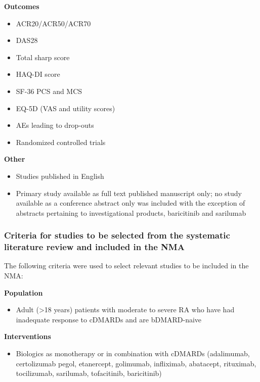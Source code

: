 \documentclass[11pt,final,fleqn]{article}\usepackage[]{graphicx}\usepackage[]{color}
\theoremstyle{plain}
\begin{document}
\begin{appendices}
\textbf{Outcomes}
\begin{itemize}
\item
  ACR20/ACR50/ACR70
\item
  DAS28
\item
  Total sharp score
\item
  HAQ-DI score
\item
  SF-36 PCS and MCS
\item
  EQ-5D (VAS and utility scores)
\item
  AEs leading to drop-outs
\end{itemize}

\begin{itemize}
\item
  Randomized controlled trials
\end{itemize}

\textbf{Other}

\begin{itemize}
\item
  Studies published in English
\item
  Primary study available as full text published manuscript only; no
  study available as a conference abstract only was included with the
  exception of abstracts pertaining to investigational products,
  baricitinib and sarilumab
\end{itemize}

\subsubsection{Criteria for studies to be selected from the systematic
literature review and included in the
NMA}\label{criteria-for-studies-to-be-selected-from-the-systematic-literature-review-and-included-in-the-nma}

The following criteria were used to select relevant studies to be
included in the NMA:

\textbf{Population}

\begin{itemize}
\item
  Adult (\textgreater{}18 years) patients with moderate to severe RA who
  have had inadequate response to cDMARDs and are bDMARD-naive
\end{itemize}

\textbf{Interventions}

\begin{itemize}
\item
  Biologics as monotherapy or in combination with cDMARDs (adalimumab,
  certolizumab pegol, etanercept, golimumab, infliximab, abatacept,
  rituximab, tocilizumab, sarilumab, tofacitinib, baricitinib)
\end{itemize}


\end{appendices}
\end{document}
